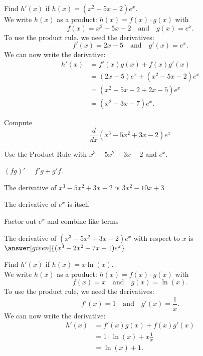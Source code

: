 \documentclass{ximera}
\begin{document}
\begin{example} %
Find $h'(x)$ if $h(x) = (x^2 - 5x - 2)e^x$.\\
We write $h(x)$ as a product: $h(x) = f(x) \cdot g(x)$ with
\[f(x) = x^2 - 5x -2 \quad \text{and} \quad g(x) = e^x.\]
To use the product rule, we need the derivatives:
\[f'(x) = 2x - 5 \quad \text{and} \quad g'(x)= e^x.\]
We can now write the derivative:
\begin{align*}
h'(x) &= f'(x)g(x) + f(x)g'(x) \\
&= (2x - 5)e^x+ (x^2 - 5x - 2)e^x  \\
&= (x^2 - 5x - 2 + 2x - 5)e^x \\
&= (x^2 - 3x - 7)e^x.
\end{align*}
\end{example}


\begin{center}
\begin{foldable}
\end{foldable}
\end{center}


\begin{problem} %
  Compute
  \[
  \frac{d}{dx} (x^3 - 5x^2 + 3x -2)e^x
  \]
  
    \begin{hint}
      Use the Product Rule with $x^3 - 5x^2 + 3x -2$ and $e^x$.
    \end{hint}
    \begin{hint}
      $(fg)' = f'g+g'f$.
    \end{hint}
    \begin{hint}
      The derivative of $x^3 - 5x^2 + 3x -2$ is $3x^2 - 10x + 3$
    \end{hint}
    \begin{hint}
      The derivative of $e^x$ is itself
    \end{hint}
    \begin{hint}
      Factor out $e^x$ and combine like terms 
    \end{hint}
		The derivative of $(x^3 - 5x^2 + 3x -2)e^x$ with respect to $x$ is
		 $\answer[given]{(x^3 - 2x^2 - 7x +1)e^x}$
		
\end{problem}




\begin{example} %
Find $h'(x)$ if $h(x) = x\ln(x)$.\\
We write $h(x)$ as a product: $h(x) = f(x) \cdot g(x)$ with
\[f(x) = x \quad \text{and} \quad g(x) = \ln(x).\]
To use the product rule, we need the derivatives:
\[f'(x) = 1 \quad \text{and} \quad g'(x)= \frac{1}{x}.\]
We can now write the derivative:
\begin{align*}
h'(x) &= f'(x)g(x) + f(x)g'(x) \\
&=  1 \cdot \ln(x) + x\frac{1}{x}  \\
&=  \ln(x) + 1.
\end{align*}
\end{example}
\end{document}
